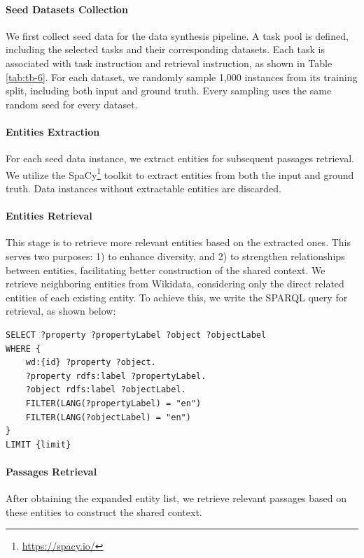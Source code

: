 \documentclass[11pt]{article}
\begin{document}
\paragraph{Seed Datasets Collection} We first collect seed data for the data synthesis pipeline. A task pool is defined, including the selected tasks and their corresponding datasets. Each task is associated with task instruction and retrieval instruction, as shown in Table \ref{tab:tb-6}. For each dataset, we randomly sample 1,000 instances from its training split, including both input and ground truth. Every sampling uses the same random seed for every dataset.


\paragraph{Entities Extraction} For each seed data instance, we extract entities for subsequent passages retrieval. We utilize the SpaCy\footnote{\url{https://spacy.io/}} toolkit to extract entities from both the input and ground truth. Data instances without extractable entities are discarded.

\paragraph{Entities Retrieval} This stage is to retrieve more relevant entities based on the extracted ones. This serves two purposes: 1) to enhance diversity, and 2) to strengthen relationships between entities, facilitating better construction of the shared context. We retrieve neighboring entities from Wikidata, considering only the direct related entities of each existing entity. To achieve this, we write the SPARQL query for retrieval, as shown below:


\begin{lstlisting}[style=SQLStyle]
SELECT ?property ?propertyLabel ?object ?objectLabel
WHERE {
    wd:{id} ?property ?object.
    ?property rdfs:label ?propertyLabel.
    ?object rdfs:label ?objectLabel.
    FILTER(LANG(?propertyLabel) = "en")
    FILTER(LANG(?objectLabel) = "en")
}
LIMIT {limit}
\end{lstlisting}


\paragraph{Passages Retrieval} After obtaining the expanded entity list, we retrieve relevant passages based on these entities to construct the shared context.
\end{document}
